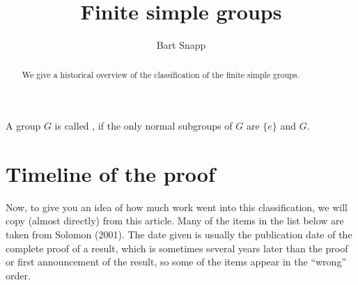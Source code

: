 \documentclass{ximera}
\author{Bart Snapp}
\title{Finite simple groups}
\begin{document}
\begin{abstract}
  We give a historical overview of the classification of the finite
  simple groups. 
\end{abstract}
\maketitle


\begin{definition}
  A group $G$ is called , if the only normal subgroups of
  $G$ are $\{e\}$ and $G$.
\end{definition}





\section{Timeline of the proof}


Now, to give you an idea of how much work went into this
classification, we will copy (almost directly) from this
article. Many of the items in the list below are taken from Solomon
(2001). The date given is usually the publication date of the complete
proof of a result, which is sometimes several years later than the
proof or first announcement of the result, so some of the items appear
in the ``wrong'' order.
\end{document}
